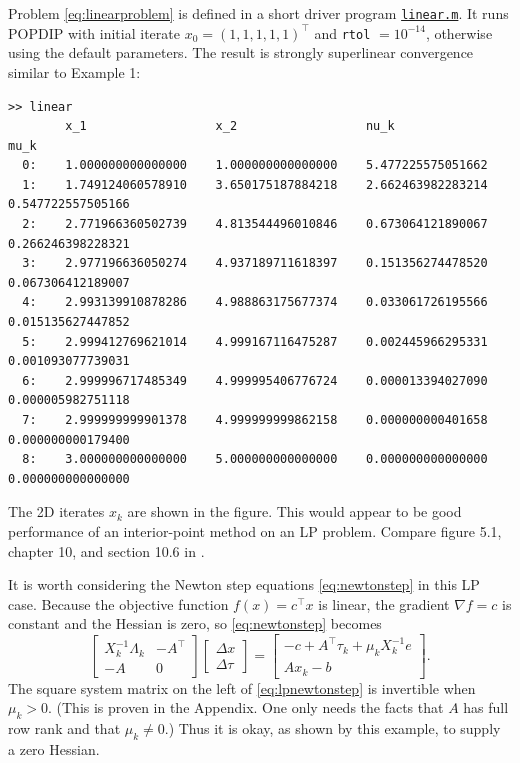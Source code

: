 \documentclass[11pt]{article}
\newcommand{\grad}{\nabla}
\begin{document}
Problem \eqref{eq:linearproblem} is defined in a short driver program \href{https://github.com/bueler/popdip/blob/main/matlab/linear.m}{\texttt{linear.m}}.  It runs POPDIP with initial iterate $x_0=(1,1,1,1,1)^\top$ and \texttt{rtol} $=10^{-14}$, otherwise using the default parameters.  The result is strongly superlinear convergence similar to Example 1:
\begin{Verbatim}[fontsize=\footnotesize]
>> linear
        x_1                  x_2                  nu_k                 mu_k
  0:    1.000000000000000    1.000000000000000    5.477225575051662
  1:    1.749124060578910    3.650175187884218    2.662463982283214    0.547722557505166
  2:    2.771966360502739    4.813544496010846    0.673064121890067    0.266246398228321
  3:    2.977196636050274    4.937189711618397    0.151356274478520    0.067306412189007
  4:    2.993139910878286    4.988863175677374    0.033061726195566    0.015135627447852
  5:    2.999412769621014    4.999167116475287    0.002445966295331    0.001093077739031
  6:    2.999996717485349    4.999995406776724    0.000013394027090    0.000005982751118
  7:    2.999999999901378    4.999999999862158    0.000000000401658    0.000000000179400
  8:    3.000000000000000    5.000000000000000    0.000000000000000    0.000000000000000
\end{Verbatim}

The 2D iterates $x_k$ are shown in the figure.  This would appear to be good performance of an interior-point method on an LP problem.  Compare figure 5.1, chapter 10, and section 10.6 in \cite{GrivaNashSofer2009}.

It is worth considering the Newton step equations \eqref{eq:newtonstep} in this LP case.  Because the objective function $f(x) = c^\top x$ is linear, the gradient $\grad f=c$ is constant and the Hessian is zero, so \eqref{eq:newtonstep} becomes
\begin{equation}
\begin{bmatrix}
X_k^{-1}\Lambda_k  & -A^\top \\
-A                 & 0
\end{bmatrix}
\begin{bmatrix}
\Delta x \\
\Delta \tau
\end{bmatrix}
=
\begin{bmatrix}
-c + A^\top \tau_k + \mu_k X_k^{-1} e \\
A x_k - b
\end{bmatrix}. \label{eq:lpnewtonstep}
\end{equation}
The square system matrix on the left of \eqref{eq:lpnewtonstep} is invertible when $\mu_k>0$.  (This is proven in the Appendix.  One only needs the facts that $A$ has full row rank and that $\mu_k\ne 0$.)  Thus it is okay, as shown by this example, to supply a zero Hessian.
\end{document}
